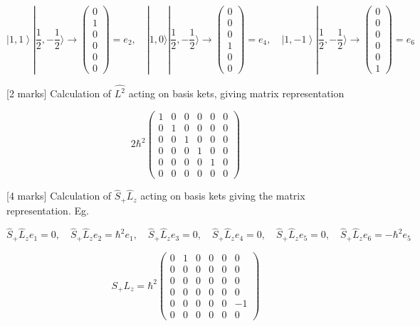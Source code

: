 \documentclass[a4paper,11pt]{article}
\begin{document}
\[
 \left|1, 1 \right> |\frac{1}{2},-\frac{1}{2} \rangle \rightarrow \begin{pmatrix} 0\\ 1\\ 0\\ 0\\ 0\\ 0 \end{pmatrix} = e_2, \quad |1, 0 \rangle |\frac{1}{2}, -\frac{1}{2} \rangle \rightarrow \begin{pmatrix} 0\\ 0\\ 0\\ 1\\ 0\\ 0 \end{pmatrix} = e_4, \quad \left|1, -1 \right>|\frac{1}{2}, -\frac{1}{2} \rangle \rightarrow \begin{pmatrix} 0\\ 0\\ 0\\ 0\\ 0\\ 1 \end{pmatrix} = e_6
\]

[2 marks] Calculation of  \( \hat{L^{2}} \) acting on basis kets, giving matrix representation 

\[ 
2\hbar^2 \begin{pmatrix} 1 & 0 & 0 & 0 & 0 & 0\\  0 & 1 & 0 & 0 & 0 & 0\\ 0 & 0 & 1 & 0 & 0 & 0\\ 0 & 0 & 0 & 1 & 0 & 0\\ 0 & 0 & 0 & 0 & 1 & 0\\ 0 & 0 & 0 & 0 & 0 & 0 \end{pmatrix}
\]

[4 marks] Calculation of \( \hat{S}_{+}\hat{L}_{z} \) acting on basis kets giving the matrix representation. Eg. 

\[
\hat{S}_{+}\hat{L}_{z}e_1 = 0, \quad \hat{S}_{+}\hat{L}_{z}e_2 = \hbar^2e_1, \quad \hat{S}_{+}\hat{L}_{z}e_3 = 0, \quad \hat{S}_{+}\hat{L}_{z}e_4 = 0, \quad \hat{S}_{+}\hat{L}_{z}e_5 = 0, \quad \hat{S}_{+}\hat{L}_{z}e_6 = -\hbar^2e_5 
\]

\[ 
S_{+}L_{z} = \hbar^2 \begin{pmatrix} 0 & 1 & 0 & 0 & 0 & 0\\ 0 & 0 & 0 & 0 & 0 & 0\\ 0 & 0 & 0 & 0 & 0 & 0\\ 0 & 0 & 0 & 0 & 0 & 0\\ 0 & 0 & 0 & 0 & 0 & -1\\ 0 & 0 & 0 & 0 & 0 & 0 \end{pmatrix}
\]
\end{document}
